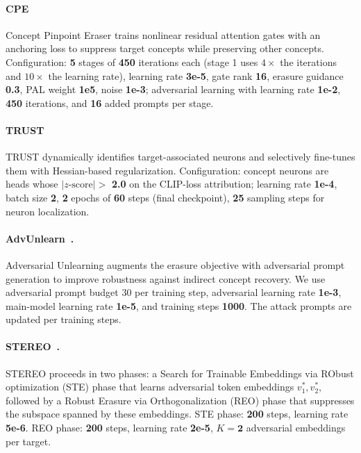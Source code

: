 \paragraph{CPE~\citep{lee2025concept}}
Concept Pinpoint Eraser trains nonlinear residual attention gates with an anchoring loss to suppress target concepts while preserving other concepts.
Configuration: \textbf{5} stages of \textbf{450} iterations each (stage 1 uses $4\times$ the iterations and $10\times$ the learning rate), learning rate \textbf{3e-5}, gate rank \textbf{16}, erasure guidance \textbf{0.3}, PAL weight \textbf{1e5}, noise \textbf{1e-3}; adversarial learning with learning rate \textbf{1e-2}, \textbf{450} iterations, and \textbf{16} added prompts per stage.

\paragraph{TRUST~\citep{kori2026selective}}
TRUST dynamically identifies target-associated neurons and selectively fine-tunes them with Hessian-based regularization.
Configuration: concept neurons are heads whose $|z\text{-score}| > $ \textbf{2.0} on the CLIP-loss attribution; learning rate \textbf{1e-4}, batch size \textbf{2}, \textbf{2} epochs of \textbf{60} steps (final checkpoint), \textbf{25} sampling steps for neuron localization.

\paragraph{AdvUnlearn~\citep{zhang2024defensive}.} 
Adversarial Unlearning augments the erasure objective with adversarial prompt generation to improve robustness against indirect concept recovery. We use adversarial prompt budget 30 per training step, adversarial learning rate \textbf{1e-3}, main-model learning rate \textbf{1e-5}, and training steps \textbf{1000}. The attack prompts are updated per training steps.
\paragraph{STEREO~\citep{srivatsan2025stereo}.} 
STEREO proceeds in two phases: a Search for Trainable Embeddings via RObust optimization (STE) phase that learns adversarial token embeddings $v_1^*, v_2^*$, followed by a Robust Erasure via Orthogonalization (REO) phase that suppresses the subspace spanned by these embeddings. STE phase: \textbf{200} steps, learning rate 
\textbf{5e-6}. REO phase: \textbf{200} steps, learning rate \textbf{2e-5}, $K = \textbf{2}$ adversarial embeddings per target.

